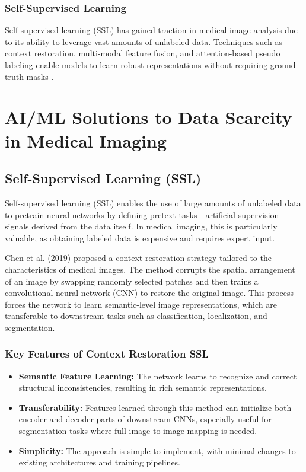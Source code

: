 \documentclass{article}
\begin{document}
\subsubsection{Self-Supervised Learning}
Self-supervised learning (SSL) has gained traction in medical image analysis due to its ability to leverage vast amounts of unlabeled data. Techniques such as context restoration, multi-modal feature fusion, and attention-based pseudo labeling enable models to learn robust representations without requiring ground-truth masks​
​\cite{CHAITANYA2021101934,zhengHierarchicalSelfsupervisedLearning2021}.




\section{AI/ML Solutions to Data Scarcity in Medical Imaging}
\label{sec:ml_technologies}

\subsection{Self-Supervised Learning (SSL)}

Self-supervised learning (SSL) enables the use of large amounts of unlabeled data to pretrain neural networks by defining pretext tasks—artificial supervision signals derived from the data itself. In medical imaging, this is particularly valuable, as obtaining labeled data is expensive and requires expert input​.

Chen et al. (2019)\cite{chenSelfsupervisedLearningMedical2019} proposed a context restoration strategy tailored to the characteristics of medical images. The method corrupts the spatial arrangement of an image by swapping randomly selected patches and then trains a convolutional neural network (CNN) to restore the original image. This process forces the network to learn semantic-level image representations, which are transferable to downstream tasks such as classification, localization, and segmentation​.

\subsubsection{Key Features of Context Restoration SSL}
\begin{itemize}
    \item \textbf{Semantic Feature Learning:} The network learns to recognize and correct structural inconsistencies, resulting in rich semantic representations.
    \item \textbf{Transferability:} Features learned through this method can initialize both encoder and decoder parts of downstream CNNs, especially useful for segmentation tasks where full image-to-image mapping is needed​.
    \item \textbf{Simplicity:} The approach is simple to implement, with minimal changes to existing architectures and training pipelines.
\end{itemize}
\end{document}
